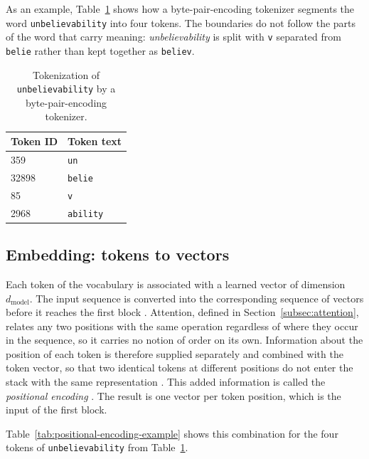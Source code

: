 As an example, Table~\ref{tab:tokenization-example} shows how a byte-pair-encoding tokenizer segments the word \texttt{unbelievability} into four tokens. The boundaries do not follow the parts of the word that carry meaning: \emph{unbelievability} is split with \texttt{v} separated from \texttt{belie} rather than kept together as \texttt{believ}.

\begin{table}[ht]
    \centering
    \renewcommand{\arraystretch}{1.2}
    \begin{tabular}{@{}ll@{}}
        \toprule
        Token ID & Token text \\
        \midrule
        359 & \texttt{un} \\
        32898 & \texttt{belie} \\
        85 & \texttt{v} \\
        2968 & \texttt{ability} \\
        \bottomrule
    \end{tabular}
    \caption[Tokenization of \texttt{unbelievability} by a byte-pair-encoding tokenizer]{Tokenization of \texttt{unbelievability} by a byte-pair-encoding tokenizer.}
    \label{tab:tokenization-example}
\end{table}

\subsection{Embedding: tokens to vectors}
\label{subsec:embedding}

Each token of the vocabulary is associated with a learned vector of dimension $d_{\mathrm{model}}$. The input sequence is converted into the corresponding sequence of vectors before it reaches the first block \cite{vaswaniAttentionAllYou2023}. Attention, defined in Section~\ref{subsec:attention}, relates any two positions with the same operation regardless of where they occur in the sequence, so it carries no notion of order on its own. Information about the position of each token is therefore supplied separately and combined with the token vector, so that two identical tokens at different positions do not enter the stack with the same representation \cite{vaswaniAttentionAllYou2023}. This added information is called the \emph{positional encoding} \cite{vaswaniAttentionAllYou2023}. The result is one vector per token position, which is the input of the first block.

Table~\ref{tab:positional-encoding-example} shows this combination for the four tokens of \texttt{unbelievability} from Table~\ref{tab:tokenization-example}.


